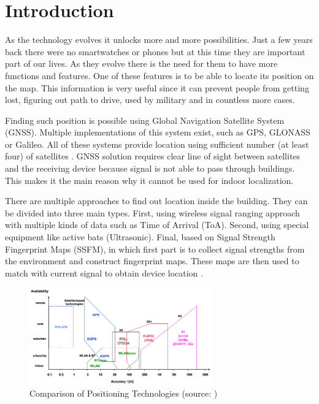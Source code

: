 \chapter{Introduction}\label{sec:Introduction}
\setcounter{page}{1}
As the technology evolves it unlocks more and more possibilities. Just a few years back there were no smartwatches or phones but at this time they are important part of our lives. As they evolve there is the need for them to have more functions and features. One of these features is to be able to locate its position on the map. This information is very useful since it can prevent people from getting lost, figuring out path to drive, used by military and in countless more cases.

Finding such position is possible using Global Navigation Satellite System (GNSS). Multiple implementations of this system exist, such as GPS, GLONASS or Galileo. All of these systems provide location using sufficient number (at least four) of satellites \cite{GNSS, GNSSGPS}. GNSS solution requires clear line of sight between satellites and the receiving device because signal is not able to pass through buildings. This makes it the main reason why it cannot be used for indoor localization.

There are multiple approaches to find out location inside the building. They can be divided into three main types. First, using wireless signal ranging approach with multiple kinds of data such as Time of Arrival (ToA). Second, using special equipment like active bats (Ultrasonic). Final, based on Signal Strength Fingerprint Maps (SSFM), in which first part is to collect signal strengths from the environment and construct fingerprint maps. These maps are then used to match with current signal to obtain device location \cite{LocalizationApproaches}.

\begin{figure}[h!]
	\begin{centering}
		\includegraphics[width=0.7\textwidth]{img/1_comparison_of_positionin_technologies}
		\par\end{centering}
	\caption{Comparison of Positioning Technologies (source: \cite{PedestrianDeadReckoning})\label{fig:1_comparison_of_positionin_technologies}}
	\label{fig01c01}
\end{figure}

